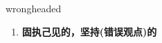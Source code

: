 
\begin{frame}
{\huge wrongheaded}
\begin{center}
\begin{enumerate}\Large
  \item \textbf{固执己见的，坚持(错误观点)的}
\end{enumerate}
\end{center}
\end{frame}
